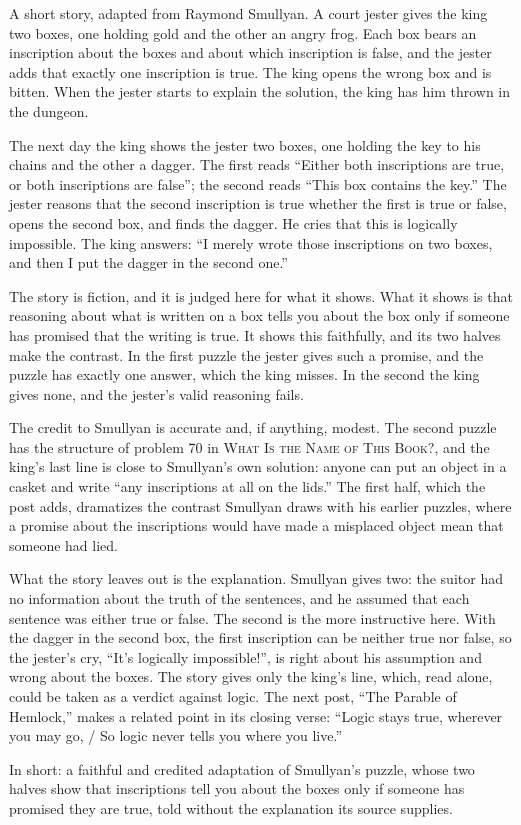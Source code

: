 \begin{afterword}
\summaryhead

A short story, adapted from Raymond Smullyan. A court jester gives the king two boxes, one holding gold and the other an angry frog. Each box bears an inscription about the boxes and about which inscription is false, and the jester adds that exactly one inscription is true. The king opens the wrong box and is bitten. When the jester starts to explain the solution, the king has him thrown in the dungeon.

The next day the king shows the jester two boxes, one holding the key to his chains and the other a dagger. The first reads ``Either both inscriptions are true, or both inscriptions are false''; the second reads ``This box contains the key.'' The jester reasons that the second inscription is true whether the first is true or false, opens the second box, and finds the dagger. He cries that this is logically impossible. The king answers: ``I merely wrote those inscriptions on two boxes, and then I put the dagger in the second one.''

\responsehead

The story is fiction, and it is judged here for what it shows. What it shows is that reasoning about what is written on a box tells you about the box only if someone has promised that the writing is true. It shows this faithfully, and its two halves make the contrast. In the first puzzle the jester gives such a promise, and the puzzle has exactly one answer, which the king misses. In the second the king gives none, and the jester's valid reasoning fails.

The credit to Smullyan is accurate and, if anything, modest. The second puzzle has the structure of problem 70 in \textsc{What Is the Name of This Book?}, and the king's last line is close to Smullyan's own solution: anyone can put an object in a casket and write ``any inscriptions at all on the lids.'' The first half, which the post adds, dramatizes the contrast Smullyan draws with his earlier puzzles, where a promise about the inscriptions would have made a misplaced object mean that someone had lied.

What the story leaves out is the explanation. Smullyan gives two: the suitor had no information about the truth of the sentences, and he assumed that each sentence was either true or false. The second is the more instructive here. With the dagger in the second box, the first inscription can be neither true nor false, so the jester's cry, ``It's logically impossible!'', is right about his assumption and wrong about the boxes. The story gives only the king's line, which, read alone, could be taken as a verdict against logic. The next post, ``The Parable of Hemlock,'' makes a related point in its closing verse: ``Logic stays true, wherever you may go, / So logic never tells you where you live.''

In short: a faithful and credited adaptation of Smullyan's puzzle, whose two halves show that inscriptions tell you about the boxes only if someone has promised they are true, told without the explanation its source supplies.
\end{afterword}

